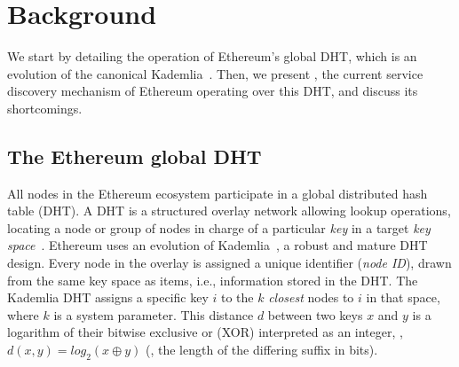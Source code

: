 

\section{Background}
\label{sec:background}

We start by detailing the operation of Ethereum's global DHT, which is an evolution of the canonical Kademlia~\cite{maymounkov2002kademlia}.
Then, we present \discv, the current service discovery mechanism of Ethereum operating over this DHT, and discuss its shortcomings.

\subsection{The Ethereum global DHT}
\label{sec:background:dht}

All nodes in the Ethereum ecosystem participate in a global distributed hash table (DHT).
A DHT is a structured overlay network allowing lookup operations, \ie locating a node or group of nodes in charge of a particular \emph{key} in a target \emph{key space}~\cite{chord,rowstron2001pastry}. 
Ethereum uses an evolution of Kademlia~\cite{maymounkov2002kademlia}, a robust and mature DHT design. %
Every node in the overlay is assigned a unique identifier (\emph{node ID}), drawn from the same key space as items, i.e., information stored in the DHT.
The Kademlia DHT assigns a specific key $i$ to the $k$ \emph{closest} nodes to $i$ in that space, where $k$ is a system parameter.
This distance $d$ between two keys $x$ and $y$ is a logarithm of their bitwise exclusive or (XOR) interpreted as an integer, \ie, $d(x,y) = \textit{log}_2(x \oplus y)$ (\ie, the length of the differing suffix in bits).


